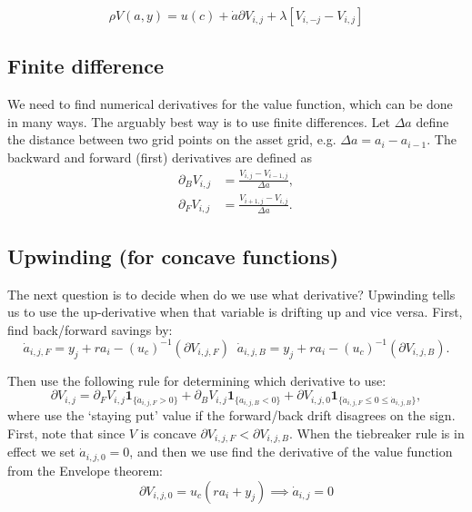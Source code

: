 \documentclass[12pt]{article}
\DeclareMathOperator{\1}{\mathbbm{1}}
\begin{document}
\begin{equation}
\rho V(a,y) =u(c) + \dot a \partial V_{i,j} + \lambda [V_{i,-j} - V_{i,j}]
\end{equation}

\subsection{Finite difference}
We need to find numerical derivatives for the value function, which can be done in many ways. The arguably best way is to use finite differences. Let $\Delta a$ define the distance between two grid points on the asset grid, e.g. $\Delta a=a_i-a_{i-1}$. The backward and forward (first) derivatives are defined as
	\begin{align}
	\partial_{B}V_{i,j}&=\frac{V_{i,j}-V_{i-1,j}}{\Delta a}, \label{eq:backder}\\
	\partial_{F}V_{i,j}&=\frac{V_{i+1,j}-V_{i,j}}{\Delta a}. \label{eq:forder}
	\end{align}
	
	\subsection{Upwinding (for concave functions)}
	The next question is to decide when do we use what derivative? Upwinding tells us to use the up-derivative when that variable is drifting up and vice versa. First, find back/forward savings by:
	\begin{equation}
	\dot a_{i,j,F} = y_j + r a_i -(u_c)^{-1}(\partial V_{i,j,F}) \;\; 	\dot a_{i,j,B} = y_j + r a_i -(u_c)^{-1}(\partial V_{i,j,B}).
	\end{equation}
	
	Then use the following rule for determining which derivative to use:
	\begin{equation}\label{eq:upwind}
	\partial V_{i,j}=\partial_F V_{i,j}\mathbf{1}_{\{\dot a_{i,j,F}>0\}} + \partial_B V_{i,j}\mathbf{1}_{\{\dot a_{i,j,B}<0\}} +  {\partial V_{i,j,0}}\mathbf{1}_{\{\dot a_{i,j,F}\le 0 \le \dot a_{i,j,B}\}},
	\end{equation}
	where use the `staying put' value if the forward/back drift disagrees on the sign. First, note that since $V$ is concave $\partial V_{i,j,F}<\partial V_{i,j,B}$. When the tiebreaker rule is in effect we set $\dot a_{i,j,0}=0$, and then we use find the derivative of the value function from the Envelope theorem: \begin{equation}
    \partial	V_{i,j,0} = u_c(r a_i+y_j) \implies \dot a_{i,j} = 0
	\end{equation}
	
\end{document}
